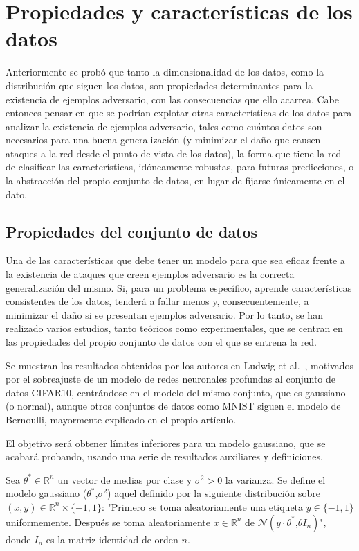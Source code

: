 \section{Propiedades y características de los datos}

Anteriormente se probó que tanto la dimensionalidad de los datos, como la distribución que siguen los datos, son propiedades determinantes para la existencia de ejemplos adversario, con las consecuencias que ello acarrea. Cabe entonces pensar en que se podrían explotar otras características de los datos para analizar la existencia de ejemplos adversario, tales como cuántos datos son necesarios para una buena generalización (y minimizar el daño que causen ataques a la red desde el punto de vista de los datos), la forma que tiene la red de clasificar las características, idóneamente robustas, para futuras predicciones, o la abstracción del propio conjunto de datos, en lugar de fijarse únicamente en el dato.

\subsection{Propiedades del conjunto de datos}
Una de las características que debe tener un modelo para que sea eficaz frente a la existencia de ataques que creen ejemplos adversario es la correcta generalización del mismo. Si, para un problema específico, aprende características consistentes de los datos, tenderá a fallar menos y, consecuentemente, a minimizar el daño si se presentan ejemplos adversario. Por lo tanto, se han realizado varios estudios, tanto teóricos como experimentales, que se centran en las propiedades del propio conjunto de datos con el que se entrena la red.

Se muestran los resultados obtenidos por los autores en Ludwig et al.~\cite{RequiresDataLudwig}, motivados por el sobreajuste de un modelo de redes neuronales profundas al conjunto de datos CIFAR10, centrándose en el modelo del mismo conjunto, que es gaussiano (o normal), aunque otros conjuntos de datos como MNIST siguen el modelo de Bernoulli, mayormente explicado en el propio artículo.

El objetivo será obtener límites inferiores para un modelo gaussiano, que se acabará probando, usando una serie de resultados auxiliares y definiciones.

\begin{definicion}
Sea $\theta^* \in \mathbb{R}^n$ un vector de medias por clase y $\sigma^2 > 0$ la varianza. Se define el modelo gaussiano ($\theta^*$,$\sigma^2$) aquel definido por la siguiente distribución sobre $(x,y) \in \mathbb{R}^n \times \{-1,1\}$: "Primero se toma aleatoriamente una etiqueta $y \in \{-1,1\}$ uniformemente. Después se toma aleatoriamente $x \in \mathbb{R}^n$ de $\mathcal{N}(y \cdot \theta^* \text{,}\theta I_n)$", donde $I_n$ es la matriz identidad de orden $n$.
\end{definicion}

